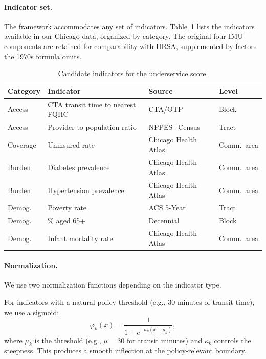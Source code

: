 \documentclass[11pt]{article}
\begin{document}
\paragraph{Indicator set.}
The framework accommodates any set of indicators. Table~\ref{tab:indicators}
lists the indicators available in our Chicago data, organized by category.
The original four IMU components are retained for comparability with HRSA,
supplemented by factors the 1970s formula omits.

\begin{table}[H]
\centering
\caption{Candidate indicators for the underservice score.}
\label{tab:indicators}
\begin{tabular}{llll}
\toprule
\textbf{Category} & \textbf{Indicator} & \textbf{Source} & \textbf{Level} \\
\midrule
Access   & CTA transit time to nearest FQHC     & CTA/OTP     & Block  \\
Access   & Provider-to-population ratio          & NPPES+Census & Tract  \\
Coverage & Uninsured rate                        & Chicago Health Atlas & Comm.\ area \\
Burden   & Diabetes prevalence                   & Chicago Health Atlas & Comm.\ area \\
Burden   & Hypertension prevalence               & Chicago Health Atlas & Comm.\ area \\
Demog.   & Poverty rate                          & ACS 5-Year  & Tract  \\
Demog.   & \% aged 65+                           & Decennial   & Block  \\
Demog.   & Infant mortality rate                 & Chicago Health Atlas & Comm.\ area \\
\bottomrule
\end{tabular}
\end{table}

\paragraph{Normalization.}
We use two normalization functions depending on the indicator type.

For indicators with a natural policy threshold (e.g., 30 minutes of transit
time), we use a sigmoid:
\begin{equation}\label{eq:sigmoid}
  \varphi_k(x) = \frac{1}{1 + e^{-\kappa_k (x - \mu_k)}},
\end{equation}
where $\mu_k$ is the threshold (e.g., $\mu = 30$ for transit minutes) and
$\kappa_k$ controls the steepness. This produces a smooth inflection at the
policy-relevant boundary.
\end{document}
